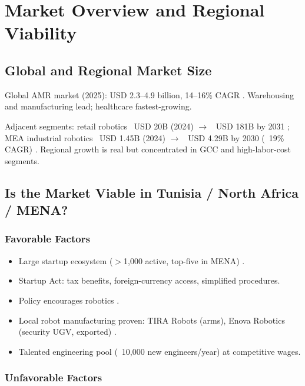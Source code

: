 \chapter{Market Overview and Regional Viability}

\section{Global and Regional Market Size}

Global AMR market (2025): USD 2.3--4.9 billion, 14--16\% CAGR \cite{valuates_agv_amr}. Warehousing and manufacturing lead; healthcare fastest-growing.

Adjacent segments: retail robotics ~USD 20B (2024) $\rightarrow$ ~USD 181B by 2031 \cite{gii_retail2030}; MEA industrial robotics ~USD 1.45B (2024) $\rightarrow$ ~USD 4.29B by 2030 (~19\% CAGR) \cite{grandview_mea}. Regional growth is real but concentrated in GCC and high-labor-cost segments.

\section{Is the Market Viable in Tunisia / North Africa / MENA?}

\subsection{Favorable Factors}

\begin{itemize}
    \item Large startup ecosystem ($>$1,000 active, top-five in MENA) \cite{lucidity_tunisia2025,startupgenome_tunisia,startuplist_tunisia}.
    \item Startup Act: tax benefits, foreign-currency access, simplified procedures.
    \item Policy encourages robotics \cite{sixwresearch_tunisia,meanceo_funding}.
    \item Local robot manufacturing proven: TIRA Robots (arms), Enova Robotics (security UGV, exported) \cite{wamda_tira}.
    \item Talented engineering pool (~10,000 new engineers/year) at competitive wages.
\end{itemize}

\subsection{Unfavorable Factors}


